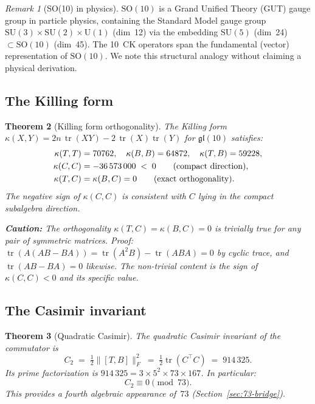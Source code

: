 \documentclass[11pt]{article}
\newtheorem{theorem}{Theorem}[section]
\theoremstyle{definition}
\theoremstyle{remark}
\newtheorem{remark}[theorem]{Remark}
\begin{document}
\begin{remark}[SO(10) in physics]
$\mathrm{SO}(10)$ is a Grand Unified Theory (GUT) gauge group in particle
physics, containing the Standard Model gauge group
$\mathrm{SU}(3) \times \mathrm{SU}(2) \times \mathrm{U}(1)$ (dim~12) via the
embedding $\mathrm{SU}(5)$ (dim~24) $\subset \mathrm{SO}(10)$ (dim~45).
The 10~CK operators span the fundamental (vector) representation of
$\mathrm{SO}(10)$.  We note this structural analogy without claiming a physical
derivation.
\end{remark}

\subsection{The Killing form}

\begin{theorem}[Killing form orthogonality]
\label{thm:killing}
The Killing form $\kappa(X,Y) = 2n\,\operatorname{tr}(XY) -
2\,\operatorname{tr}(X)\operatorname{tr}(Y)$ for $\mathfrak{gl}(10)$ satisfies:
\begin{align}
  \kappa(T,T) &= 70762, \quad \kappa(B,B) = 64872, \quad \kappa(T,B) = 59228,
  \\
  \kappa(C,C) &= -36\,573\,000 \;<\; 0
  \qquad\textup{(compact direction)},\\
  \kappa(T,C) &= \kappa(B,C) = 0
  \qquad\textup{(exact orthogonality)}.
\end{align}
The negative sign of $\kappa(C,C)$ is consistent with $C$ lying in the compact
subalgebra direction.

\textbf{Caution:} The orthogonality $\kappa(T,C) = \kappa(B,C) = 0$ is
\emph{trivially true} for any pair of symmetric matrices.  Proof:
$\operatorname{tr}(A(AB-BA)) = \operatorname{tr}(A^2B) - \operatorname{tr}(ABA)
= 0$ by cyclic trace, and $\operatorname{tr}(AB-BA) = 0$ likewise.  The
non-trivial content is the \emph{sign} of $\kappa(C,C) < 0$ and its specific
value.
\end{theorem}

\subsection{The Casimir invariant}

\begin{theorem}[Quadratic Casimir]
\label{thm:casimir}
The quadratic Casimir invariant of the commutator is
\[
  C_2 \;=\; \tfrac{1}{2}\|[T,B]\|_F^2 \;=\; \tfrac{1}{2}\operatorname{tr}(C^\top C) \;=\; 914\,325.
\]
Its prime factorization is $914\,325 = 3 \times 5^2 \times 73 \times 167$.
In particular:
\[
  C_2 \equiv 0 \pmod{73}.
\]
This provides a fourth algebraic appearance of~$73$
(Section~\ref{sec:73-bridge}).
\end{theorem}
\end{document}
